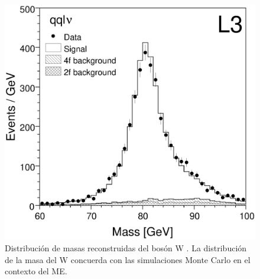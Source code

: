 \begin{figure}[h!]
\centering
\includegraphics[scale=0.4]{Images/SM-test-3.eps}
\caption[Distribución de masas reconstruidas del bosón W]{Distribución de masas reconstruidas del bosón W \cite{l32006measurement}. La distribución de la masa del W concuerda con las simulaciones Monte Carlo en el contexto del ME.}
 \label{SMt4}
\end{figure}



